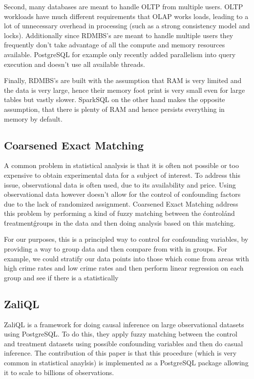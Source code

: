 \documentclass[a4paper]{article}
\begin{document}
		Second, many databases are meant to handle OLTP from multiple users. OLTP workloads have much different 
		requirements that OLAP works loads, leading to a lot of unnecessary overhead in processing (such as 
		a strong consistency model and locks). Additionally since RDMBS's are meant to handle multiple users
		they frequently don't take advantage of all the compute and memory resources available. PostgreSQL for example
		only recently added parallelism into query execution and doesn't use all available threads. 

		Finally, RDMBS's are built with the assumption that RAM is very limited and the data is very large, hence 
		their memory foot print is very small even for large tables but vastly slower. SparkSQL on the other 
		hand makes the opposite assumption, that there is plenty of RAM and hence persists everything in memory
		by default.
		
	\subsection{Coarsened Exact Matching ~\cite{ref:CEM}}
		A common problem in statistical analysis is that it is often not possible or too expensive 
		to obtain experimental data for a subject of interest. To address this issue, observational data is
		often used, due to its availability and price. Using observational data however doesn't allow for 
		the control of confounding factors due to the lack of randomized assignment. Coarsened Exact Matching
		address this problem by performing a kind of fuzzy matching between the \'control\' and \'treatment\' 
		groups in the data and then doing analysis based on this matching. 

		For our purposes, this is a principled way to control for confounding variables, by providing 
		a way to group data and then  compare from with in groups. For example, we could 
		stratify our data points into those which come from areas with high crime rates and low crime rates 
		and then perform linear regression on each group and see if there is a statistically



	\subsection{ZaliQL~\cite{ref:ZaliQL}}
		ZaliQL is a framework for doing causal inference on large observational datasets using PostgreSQL. To do this, they 
		apply fuzzy matching between the control and treatment datasets using possible confounding variables 
		and then do casual inference. The contribution of this paper is that this procedure (which is very common in statistical anaylsis)
		is implemented as a PostgreSQL package allowing it to scale to billions of observations.
\end{document}

